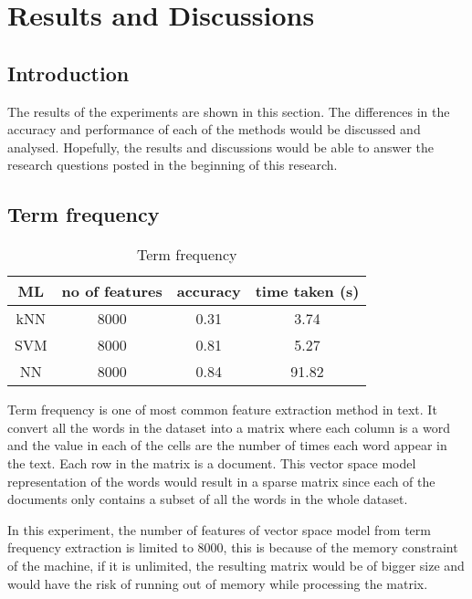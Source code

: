 
\chapter{Results and Discussions}

\section{Introduction}
The results of the experiments are shown in this section. The differences in the accuracy and performance of each of the methods would be discussed and analysed. Hopefully, the results and discussions would be able to answer the research questions posted in the beginning of this research.

\section{Term frequency}

\begin{table}[H]
	\centering
	\caption{Term frequency}
	\label{tbl:termFrequency}
	\begin{tabular}{|| c | c | c | c||}
		\hline
		ML & no of features & accuracy & time taken (s) \\ [0.5ex]
		\hline\hline
		kNN & 8000 & 0.31 & 3.74 \\ 
		\hline
		SVM & 8000 & 0.81 & 5.27 \\
		\hline
		NN & 8000 & 0.84 & 91.82 \\
		\hline
	\end{tabular}
\end{table}

Term frequency is one of most common feature extraction method in text. It convert all the words in the dataset into a matrix where each column is a word and the value in each of the cells are the number of times each word appear in the text. Each row in the matrix is a document. This vector space model representation of the words would result in a sparse matrix since each of the documents only contains a subset of all the words in the whole dataset. 

In this experiment, the number of features of vector space model from term frequency extraction is limited to 8000, this is because of the memory constraint of the machine, if it is unlimited, the resulting matrix would be of bigger size and would have the risk of running out of memory while processing the matrix. 

